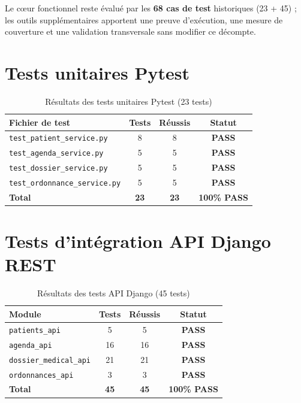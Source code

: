 \documentclass[12pt,a4paper]{report}
\begin{document}
Le c\oe{}ur fonctionnel reste évalué par les \textbf{68 cas de test} historiques (23 + 45) ; les outils supplémentaires apportent une preuve d'exécution, une mesure de couverture et une validation transversale sans modifier ce décompte.

\section{Tests unitaires Pytest}

\begin{table}[H]
\centering
\caption{Résultats des tests unitaires Pytest (23 tests)}
\renewcommand{\arraystretch}{1.4}
\begin{tabular}{|p{6cm}|c|c|c|}
  \hline
  \rowcolor{medaccent}
  \textbf{Fichier de test} & \textbf{Tests} & \textbf{Réussis} & \textbf{Statut} \\
  \hline
  \texttt{test\_patient\_service.py} & 8 & 8 & \textcolor{medgreen}{\textbf{PASS}} \\
  \hline
  \texttt{test\_agenda\_service.py} & 5 & 5 & \textcolor{medgreen}{\textbf{PASS}} \\
  \hline
  \texttt{test\_dossier\_service.py} & 5 & 5 & \textcolor{medgreen}{\textbf{PASS}} \\
  \hline
  \texttt{test\_ordonnance\_service.py} & 5 & 5 & \textcolor{medgreen}{\textbf{PASS}} \\
  \hline
  \rowcolor{medgreen!20}
  \textbf{Total} & \textbf{23} & \textbf{23} & \textcolor{medgreen}{\textbf{100\% PASS}} \\
  \hline
\end{tabular}
\end{table}

\section{Tests d'intégration API Django REST}

\begin{table}[H]
\centering
\caption{Résultats des tests API Django (45 tests)}
\renewcommand{\arraystretch}{1.4}
\begin{tabular}{|p{5cm}|c|c|c|}
  \hline
  \rowcolor{medaccent}
  \textbf{Module} & \textbf{Tests} & \textbf{Réussis} & \textbf{Statut} \\
  \hline
  \texttt{patients\_api} & 5 & 5 & \textcolor{medgreen}{\textbf{PASS}} \\
  \hline
  \texttt{agenda\_api} & 16 & 16 & \textcolor{medgreen}{\textbf{PASS}} \\
  \hline
  \texttt{dossier\_medical\_api} & 21 & 21 & \textcolor{medgreen}{\textbf{PASS}} \\
  \hline
  \texttt{ordonnances\_api} & 3 & 3 & \textcolor{medgreen}{\textbf{PASS}} \\
  \hline
  \rowcolor{medgreen!20}
  \textbf{Total} & \textbf{45} & \textbf{45} & \textcolor{medgreen}{\textbf{100\% PASS}} \\
  \hline
\end{tabular}
\end{table}
\end{document}
